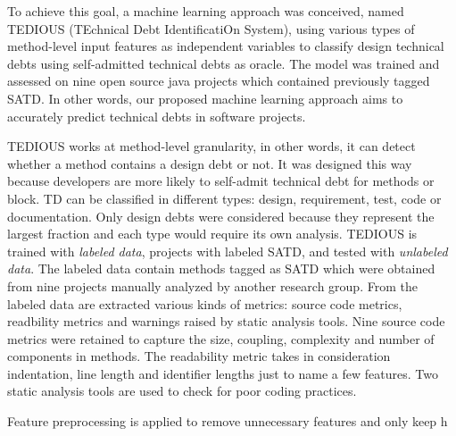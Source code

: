 \setlength{\parindent}{5ex} To achieve this goal, a machine learning approach was conceived, named TEDIOUS (TEchnical Debt IdentificatiOn System), using various types of method-level input features as independent variables to classify design technical debts using self-admitted technical debts as oracle. The model was trained and assessed on nine open source java projects which contained previously tagged SATD. In other words, our proposed machine learning approach aims to accurately predict technical debts in software projects.

\setlength{\parindent}{5ex} TEDIOUS works at method-level granularity, in other words, it can detect whether a method contains a design debt or not. It was designed this way because developers are more likely to self-admit technical debt for methods or block. TD can be classified in different types: design, requirement, test, code or documentation. Only design debts were considered because they represent the largest fraction and each type would require its own analysis. TEDIOUS is trained with \emph{labeled data}, projects with labeled SATD, and tested with \emph{unlabeled data}. The labeled data contain methods tagged as SATD which were obtained from nine projects manually analyzed by another research group. From the labeled data are extracted various kinds of metrics: source code metrics, readbility metrics and warnings raised by static analysis tools. Nine source code metrics were retained to capture the size, coupling, complexity and number of components in methods. The readability metric takes in consideration indentation, line length and identifier lengths just to name a few features. Two static analysis tools are used to check for poor coding practices. 

\setlength{\parindent}{5ex} Feature preprocessing is applied to remove unnecessary features and only keep h














